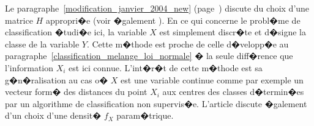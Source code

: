 Le paragraphe~\ref{modification_janvier_2004_new} (page~\pageref{modification_janvier_2004_new}) discute du choix d'une matrice $H$ appropri�e (voir �galement ). En ce qui concerne le probl�me de classification �tudi�e ici, la variable $X$ est simplement discr�te et d�signe la classe de la variable $Y$. Cette m�thode est proche de celle d�velopp�e au paragraphe~\ref{classification_melange_loi_normale} � la seule diff�rence que l'information $X_i$ est ici connue. L'int�r�t de cette m�thode est sa g�n�ralisation au cas o� $X$ est une variable continue comme par exemple un vecteur form� des distances du point $X_i$ aux centres des classes d�termin�es par un algorithme de classification non supervis�e. L'article  discute �galement d'un choix d'une densit� $f_X$ param�trique.













